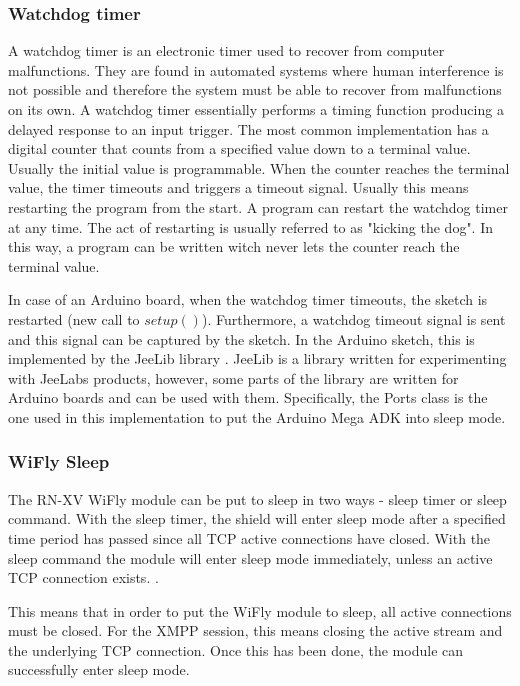 \subsubsection{Watchdog timer}
A watchdog timer \cite{watchdog_timer} is an electronic timer used to recover from computer malfunctions. They are found in automated systems where human interference is not possible and therefore the system must be able to recover from malfunctions on its own. 
A watchdog timer essentially performs a timing function producing a delayed response to an input trigger. The most common implementation has a digital counter that counts from a specified value down to a terminal value. Usually the initial value is programmable. When the counter reaches the terminal value, the timer timeouts and triggers a timeout signal. Usually this means restarting the program from the start. A program can restart the watchdog timer at any time. The act of restarting is usually referred to as "kicking the dog". In this way, a program can be written witch never lets the counter reach the terminal value.

In case of an Arduino board, when the watchdog timer timeouts, the sketch is restarted (new call to $setup()$). Furthermore, a watchdog timeout signal is sent and this signal can be captured by the sketch. In the Arduino sketch, this is implemented by the JeeLib library \cite{jeelib_general}. JeeLib is a library written for experimenting with JeeLabs products, however, some parts of the library are written for Arduino boards and can be used with them. Specifically, the Ports class \cite{jeelib_port} is the one used in this implementation to put the Arduino Mega ADK into sleep mode. 

\subsubsection{WiFly Sleep}

The RN-XV WiFly module can be put to sleep in two ways - sleep timer or sleep command. With the sleep timer, the shield will enter sleep mode after a specified time period has passed since all TCP active connections have closed. With the sleep command the module will enter sleep mode immediately, unless an active TCP connection exists. \cite{wifly_manual}. 

This means that in order to put the WiFly module to sleep, all active connections must be closed. For the XMPP session, this means closing the active stream and the underlying TCP connection. Once this has been done, the module can successfully enter sleep mode. 

